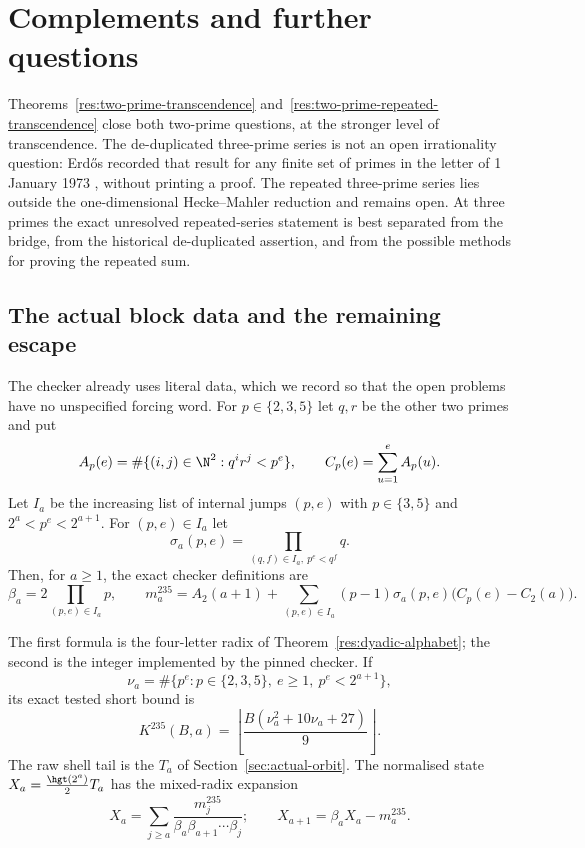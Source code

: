 
\section{Complements and further questions}\label{sec:open}

Theorems~\ref{res:two-prime-transcendence}
and~\ref{res:two-prime-repeated-transcendence} close both two-prime questions,
at the stronger level of transcendence.  The de-duplicated three-prime series
is not an open irrationality question: Erd\H{o}s recorded that result for any
finite set of primes in the letter of 1 January 1973
\cite[p.~335]{erdos1974letter}, without printing a proof.  The repeated
three-prime series lies outside the one-dimensional Hecke--Mahler reduction
and remains open.  At three primes the exact unresolved repeated-series
statement is best separated from the bridge, from the historical de-duplicated
assertion, and from the possible methods for proving the repeated sum.

\subsection{The actual block data and the remaining escape}

The checker already uses literal data, which we record so that the open
problems have no unspecified forcing word.  For $p\in\{2,3,5\}$ let $q,r$ be
the other two primes and put
\[
 A_p(e)=\#\{(i,j)\in\N^2:q^i r^j<p^e\},\qquad
 C_p(e)=\sum_{u=1}^{e}A_p(u).
\]
Let $I_a$ be the increasing list of internal jumps $(p,e)$ with
$p\in\{3,5\}$ and $2^a<p^e<2^{a+1}$.  For $(p,e)\in I_a$ let
\[
 \sigma_a(p,e)=\prod_{(q,f)\in I_a,\ p^e<q^f}q.
\]
Then, for $a\ge1$, the exact checker definitions are
\[
 \beta_a=2\prod_{(p,e)\in I_a}p,\qquad
 m_a^{235}=A_2(a+1)+
   \sum_{(p,e)\in I_a}(p-1)\sigma_a(p,e)
       \bigl(C_p(e)-C_2(a)\bigr).
\tag{9.1}\label{eq:actual-digit}
\]

The first formula is the four-letter radix of
Theorem~\ref{res:dyadic-alphabet}; the second is the integer implemented by the
pinned checker.  If
\[
 \nu_a=\#\{p^e:p\in\{2,3,5\},\ e\ge1,\ p^e<2^{a+1}\},
\]
its exact tested short bound is
\[
 K^{235}(B,a)=
 \left\lfloor\frac{B(\nu_a^2+10\nu_a+27)}9\right\rfloor.
\tag{9.2}\label{eq:actual-bound}
\]
The raw shell tail is the $T_a$ of Section~\ref{sec:actual-orbit}.  The
normalised state $X_a=\frac{\hgt(2^a)}2T_a$ has the mixed-radix expansion
\[
 X_a=\sum_{j\ge a}
   \frac{m_j^{235}}{\beta_a\beta_{a+1}\cdots\beta_j};
 \qquad X_{a+1}=\beta_a X_a-m_a^{235}.
\tag{9.3}\label{eq:actual-tail}
\]

